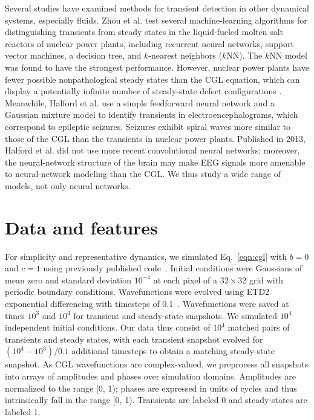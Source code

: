\documentclass[nofootinbib,pre,superscriptaddress,twocolumn,longbibliography,floatfix]{revtex4-2}
\begin{document}
Several studies have examined methods for transient detection in other dynamical systems, especially fluids.
Zhou et al. \cite{zhou2023development} test several machine-learning algorithms for distinguishing transients from steady states in the liquid-fueled molten salt reactors of nuclear power plants,
including recurrent neural networks, support vector machines, a decision tree, and $k$-nearest neighbors ($k$NN).
The $k$NN model was found to have the strongest performance.
However, nuclear power plants have fewer possible nonpathological steady states than the CGL equation, which can display a potentially infinite number of steady-state defect configurations \cite{aranson2002world}.
Meanwhile, Halford et al. \cite{halford2013standardized} use a simple feedforward neural network and a Gaussian mixture model to identify transients in electroencephalograms, which correspond to epileptic seizures.
Seizures exhibit spiral waves more similar to those of the CGL than the transients in nuclear power plants.
Published in 2013, Halford et al. did not use more recent convolutional neural networks;
moreover, the neural-network structure of the brain may make EEG signals more amenable to neural-network modeling than the CGL.
We thus study a wide range of models, not only neural networks.

\section{Data and features}
For simplicity and representative dynamics, we simulated Eq.~\ref{eqn:cgl} with $b=0$ and $c=1$ using previously published code~\cite{winterbottom2005complex,li2024measuring}.
Initial conditions were Gaussians of mean zero and standard deviation $10^{-4}$ at each pixel of a $32\times 32$ grid with periodic boundary conditions.
Wavefunctions were evolved using ETD2 exponential differencing with timesteps of 0.1~\cite{cox2002exponential}.
Wavefunctions were saved at times $10^3$ and $10^4$ for transient and steady-state snapshots.
We simulated $10^4$ independent initial conditions.
Our data thus consist of $10^4$ matched pairs of transients and steady states,
with each transient snapshot evolved for $(10^4-10^3)/0.1$ additional timesteps to obtain a matching steady-state snapshot.
As CGL wavefunctions are complex-valued,
we preprocess all snapshots into arrays of amplitudes and phases over simulation domains.
Amplitudes are normalized to the range [0, 1);
phases are expressed in units of cycles and thus intrinsically fall in the range [0, 1).
Transients are labeled 0 and steady-states are labeled 1.
\end{document}
